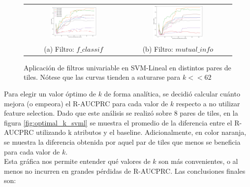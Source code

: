 \begin{figure}[h!]
\begin{tabular}{cc}
  \includegraphics[width=0.49\textwidth]{Kap5/linear_f_classif_ALL_CURVES.png} &   \includegraphics[width=0.49\textwidth]{Kap5/linear_mutual_info_classif_ALL_CURVES.png} \\
(a) Filtro: $f\_classif$ & (b) Filtro: $mutual\_info$
\end{tabular}
\caption{Aplicación de filtros univariable en SVM-Lineal en distintos pares de tiles. Nótese que las curvas tienden a saturarse para $k << 62$}
\label{fig:svml_univariate_unified}
\end{figure}

Para elegir un valor óptimo de $k$ de forma analítica, se decidió calcular cuánto mejora (o empeora) el R-AUCPRC para cada valor de $k$ respecto a no utilizar feature selection. Dado que este análisis se realizó sobre 8 pares de tiles, en la figura \ref{fig:optimal_k_svml} se muestra el promedio de la diferencia entre el R-AUCPRC utilizando k atributos y el baseline. Adicionalmente, en color naranja, se muestra la diferencia obtenida por aquel par de tiles que menos se beneficia para cada valor de $k$. \\

Esta gráfica nos permite entender qué valores de $k$ son más convenientes, o al menos no incurren en grandes pérdidas de R-AUCPRC. Las conclusiones finales son:


